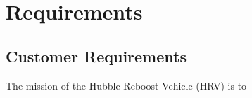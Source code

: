 \documentclass[onecolumn,10pt]{jhwhw}
\begin{document}






\chapter{Requirements}
\section{Customer Requirements}

The mission of the Hubble Reboost Vehicle (HRV) is to
\end{document}
